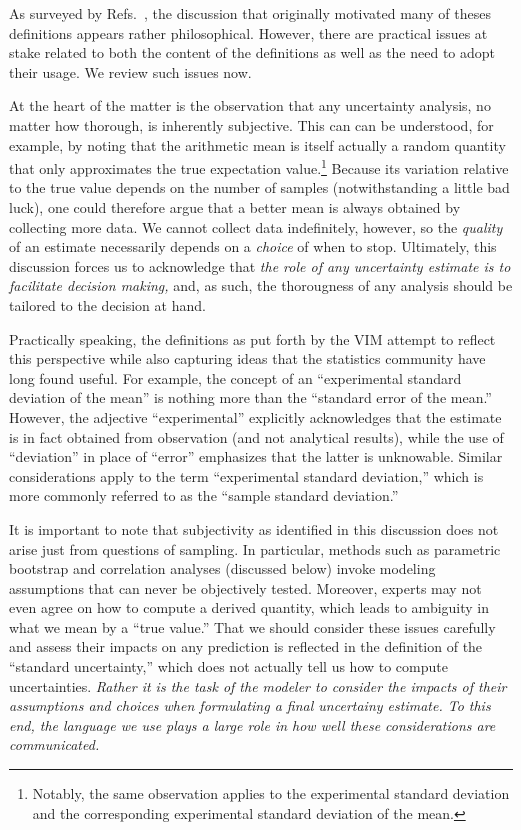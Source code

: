 As surveyed by Refs.~\citep{JCGM:GUM2008,JCGM:VIM2012}, the discussion that originally motivated many of theses definitions appears rather philosophical.  However, there are practical issues at stake related to both the content of the definitions as well as the need to adopt their usage.  We review such issues now.

At the heart of the matter is the observation that any uncertainty analysis, no matter how thorough, is inherently subjective.  This can can be understood, for example, by noting that the arithmetic mean is itself actually a random quantity that only approximates the true expectation value.\footnote{Notably, the same observation applies to the experimental standard deviation and the corresponding experimental standard deviation of the mean.}  Because its variation relative to the true value depends on the number of samples (notwithstanding a little bad luck), one could therefore argue that a better mean is always obtained by collecting more data.   We cannot collect data indefinitely, however, so the {\it quality} of an estimate necessarily depends on a {\it choice} of when to stop.  Ultimately, this discussion forces us to acknowledge that {\it the role of any uncertainty estimate is to facilitate decision making,} and, as such, the thorougness of any analysis should be tailored to the decision at hand.  

Practically speaking, the definitions as put forth by the VIM attempt to reflect this perspective while also capturing ideas that the statistics community have long found useful.  For example, the concept of an ``experimental standard deviation of the mean'' is nothing more than the ``standard error of the mean.''  However, the adjective ``experimental'' explicitly acknowledges that the estimate is in fact obtained from observation (and not analytical results), while the use of ``deviation'' in place of ``error'' emphasizes that the latter is unknowable.  Similar considerations apply to the term ``experimental standard deviation,'' which is more commonly referred to as the ``sample standard deviation.''

It is important to note that subjectivity as identified in this discussion does not arise just from questions of sampling. In particular, methods such as parametric bootstrap and correlation analyses (discussed below) invoke modeling assumptions that can never be objectively tested.  Moreover, experts may not even agree on how to compute a derived quantity, which leads to ambiguity in what we mean by a ``true value.''\cite{patrone1}  That we should consider these issues carefully and assess their impacts on any prediction is reflected in the definition of the ``standard uncertainty,'' which does not actually tell us how to compute uncertainties.  {\it Rather it is the task of the modeler to consider the impacts of their assumptions and choices when formulating a final uncertainy estimate.  To this end, the language we use plays a large role in how well these considerations are communicated.}

